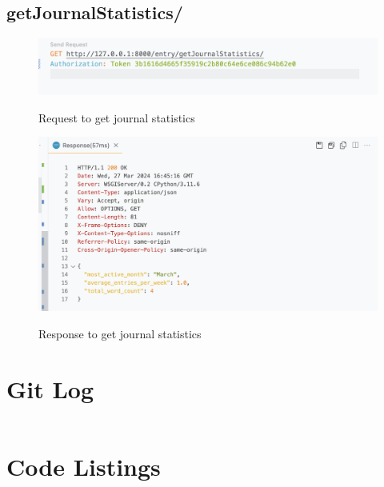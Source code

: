 \subsection{getJournalStatistics/}
\begin{figure}[H]
    \caption{Request to get journal statistics}
    \includegraphics[width=\textwidth]{Assets/api_test/request_get_journal_statistics.png}
    \label{fig:request_get_journal_statistics}
\end{figure}

\begin{figure}[H]
    \caption{Response to get journal statistics}
    \includegraphics[width=\textwidth]{Assets/api_test/response_get_journal_statistics.png}
    \label{fig:response_get_journal_statistics}
\end{figure}


\section{Git Log}
\inputminted{bash}{Assets/git_log.txt}

\section{Code Listings}


